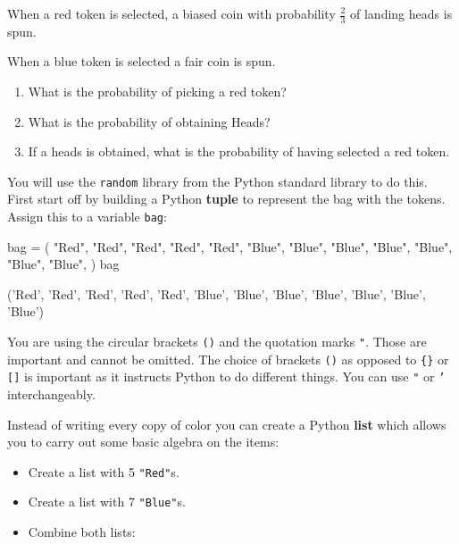 When a red token is selected, a biased coin with probability \(\frac{2}{3}\)
of landing heads is spun.


When a blue token is selected a fair coin is spun.
\begin{enumerate}

\item 

What is the probability of picking a red token?

\item 

What is the probability of obtaining Heads?

\item 

If a heads is obtained, what is the probability of having selected a red
token.

\end{enumerate}



You will use the \texttt{random} library from the Python standard library to do this.
First start off by building a Python \textbf{tuple} to represent the bag with the
tokens. Assign this to a variable \texttt{bag}:


\begin{pyin}
bag = (
    "Red",
    "Red",
    "Red",
    "Red",
    "Red",
    "Blue",
    "Blue",
    "Blue",
    "Blue",
    "Blue",
    "Blue",
    "Blue",
)
bag
\end{pyin}





\begin{raw}
('Red',
 'Red',
 'Red',
 'Red',
 'Red',
 'Blue',
 'Blue',
 'Blue',
 'Blue',
 'Blue',
 'Blue',
 'Blue')
\end{raw}






\begin{note}
You are using the circular brackets \texttt{()} and the quotation marks
\texttt{"}. Those are important and cannot be omitted. The choice of brackets
\texttt{()} as opposed to \texttt{\{\}} or \texttt{[]} is important as it instructs Python to do
different things. You can use \texttt{"} or \texttt{'}
interchangeably.
\end{note}



Instead of writing every copy of color you can create a Python \textbf{list} which allows
you to carry out some basic algebra on the items:
\begin{itemize}
\item 

Create a list with 5 \texttt{"Red"}s.

\item 

Create a list with 7 \texttt{"Blue"}s.

\item 

Combine both lists:

\end{itemize}




